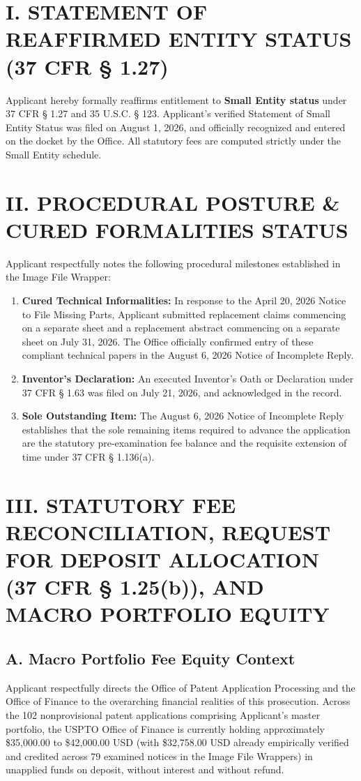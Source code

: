 \documentclass[11pt,letterpaper]{article}
\begin{document}
\section*{I. STATEMENT OF REAFFIRMED ENTITY STATUS (37 CFR \S{} 1.27)}

Applicant hereby formally reaffirms entitlement to \textbf{Small Entity status} under 37 CFR \S{} 1.27 and 35 U.S.C. \S{} 123. Applicant's verified Statement of Small Entity Status was filed on August 1, 2026, and officially recognized and entered on the docket by the Office. All statutory fees are computed strictly under the Small Entity schedule.

\section*{II. PROCEDURAL POSTURE \& CURED FORMALITIES STATUS}

Applicant respectfully notes the following procedural milestones established in the Image File Wrapper:
\begin{enumerate}[leftmargin=*]
    \item \textbf{Cured Technical Informalities:} In response to the April 20, 2026 Notice to File Missing Parts, Applicant submitted replacement claims commencing on a separate sheet and a replacement abstract commencing on a separate sheet on July 31, 2026. The Office officially confirmed entry of these compliant technical papers in the August 6, 2026 Notice of Incomplete Reply.
    \item \textbf{Inventor's Declaration:} An executed Inventor's Oath or Declaration under 37 CFR \S{} 1.63 was filed on July 21, 2026, and acknowledged in the record.
    \item \textbf{Sole Outstanding Item:} The August 6, 2026 Notice of Incomplete Reply establishes that the sole remaining items required to advance the application are the statutory pre-examination fee balance and the requisite extension of time under 37 CFR \S{} 1.136(a).
\end{enumerate}

\section*{III. STATUTORY FEE RECONCILIATION, REQUEST FOR DEPOSIT ALLOCATION (37 CFR \S{} 1.25(b)), AND MACRO PORTFOLIO EQUITY}

\subsection*{A. Macro Portfolio Fee Equity Context}
Applicant respectfully directs the Office of Patent Application Processing and the Office of Finance to the overarching financial realities of this prosecution. Across the 102 nonprovisional patent applications comprising Applicant's master portfolio, the USPTO Office of Finance is currently holding approximately \$35,000.00 to \$42,000.00 USD (with \$32,758.00 USD already empirically verified and credited across 79 examined notices in the Image File Wrappers) in unapplied funds on deposit, without interest and without refund.
\end{document}
